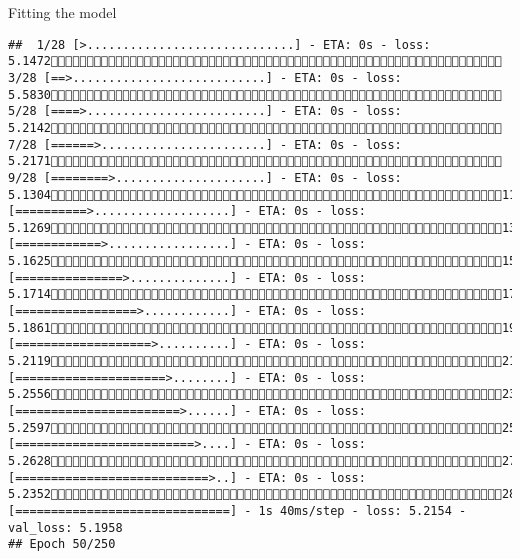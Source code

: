 \documentclass[
  ignorenonframetext,
]{beamer}
\begin{document}
\begin{frame}[fragile]{Fitting the model}
\begin{verbatim}
##  1/28 [>.............................] - ETA: 0s - loss: 5.1472 3/28 [==>...........................] - ETA: 0s - loss: 5.5830 5/28 [====>.........................] - ETA: 0s - loss: 5.2142 7/28 [======>.......................] - ETA: 0s - loss: 5.2171 9/28 [========>.....................] - ETA: 0s - loss: 5.130411/28 [==========>...................] - ETA: 0s - loss: 5.126913/28 [============>.................] - ETA: 0s - loss: 5.162515/28 [===============>..............] - ETA: 0s - loss: 5.171417/28 [=================>............] - ETA: 0s - loss: 5.186119/28 [===================>..........] - ETA: 0s - loss: 5.211921/28 [=====================>........] - ETA: 0s - loss: 5.255623/28 [=======================>......] - ETA: 0s - loss: 5.259725/28 [=========================>....] - ETA: 0s - loss: 5.262827/28 [===========================>..] - ETA: 0s - loss: 5.235228/28 [==============================] - 1s 40ms/step - loss: 5.2154 - val_loss: 5.1958
## Epoch 50/250

\end{verbatim}
\end{frame}
\end{document}
